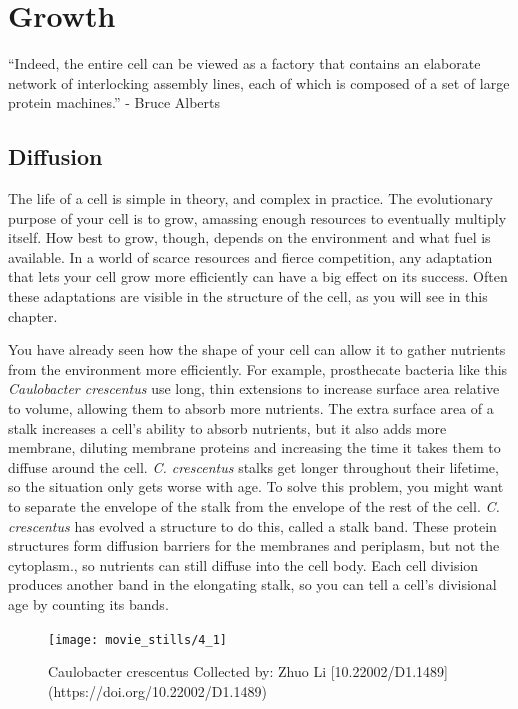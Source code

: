\documentclass[]{tufte-book}
\begin{document}
\chapter{Growth}\label{growth}

``Indeed, the entire cell can be viewed as a factory that contains an
elaborate network of interlocking assembly lines, each of which is
composed of a set of large protein machines.'' - Bruce Alberts
\citet{alberts1998}

\section{Diffusion}\label{diffusion}

The life of a cell is simple in theory, and complex in practice. The
evolutionary purpose of your cell is to grow, amassing enough resources
to eventually multiply itself. How best to grow, though, depends on the
environment and what fuel is available. In a world of scarce resources
and fierce competition, any adaptation that lets your cell grow more
efficiently can have a big effect on its success. Often these
adaptations are visible in the structure of the cell, as you will see in
this chapter.

You have already seen how the shape of your cell can allow it to gather
nutrients from the environment more efficiently. For example,
prosthecate bacteria like this \emph{Caulobacter crescentus} use long,
thin extensions to increase surface area relative to volume, allowing
them to absorb more nutrients. The extra surface area of a stalk
increases a cell's ability to absorb nutrients, but it also adds more
membrane, diluting membrane proteins and increasing the time it takes
them to diffuse around the cell. \emph{C. crescentus} stalks get longer
throughout their lifetime, so the situation only gets worse with age. To
solve this problem, you might want to separate the envelope of the stalk
from the envelope of the rest of the cell. \emph{C. crescentus} has
evolved a structure to do this, called a stalk band. These protein
structures form diffusion barriers for the membranes and periplasm, but
not the cytoplasm., so nutrients can still diffuse into the cell body.
Each cell division produces another band in the elongating stalk, so you
can tell a cell's divisional age by counting its bands.

\begin{figure}
\texttt{[image: movie\_stills/4\_1]} \caption[Caulobacter crescentus Collected by]{Caulobacter crescentus Collected by: Zhuo Li [10.22002/D1.1489](https://doi.org/10.22002/D1.1489)}\label{fig:unnamed-chunk-59}
\end{figure}
\end{document}
